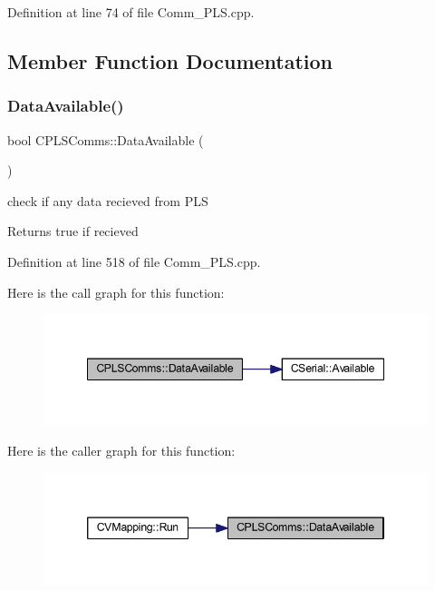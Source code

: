 Definition at line 74 of file Comm\+\_\+\+P\+L\+S.\+cpp.



\subsection{Member Function Documentation}
\mbox{\label{class_c_p_l_s_comms_ae9d000eff184034954829d76162654a5}} 
\subsubsection{\texorpdfstring{DataAvailable()}{DataAvailable()}}
{\footnotesize\ttfamily bool C\+P\+L\+S\+Comms\+::\+Data\+Available (\begin{DoxyParamCaption}{ }\end{DoxyParamCaption})}



check if any data recieved from P\+LS 

\begin{DoxyReturn}{Returns}
true if recieved 
\end{DoxyReturn}


Definition at line 518 of file Comm\+\_\+\+P\+L\+S.\+cpp.

Here is the call graph for this function\+:\nopagebreak
\begin{figure}[H]
\begin{center}
\leavevmode
\includegraphics[width=348pt]{class_c_p_l_s_comms_ae9d000eff184034954829d76162654a5_cgraph}
\end{center}
\end{figure}
Here is the caller graph for this function\+:\nopagebreak
\begin{figure}[H]
\begin{center}
\leavevmode
\includegraphics[width=346pt]{class_c_p_l_s_comms_ae9d000eff184034954829d76162654a5_icgraph}
\end{center}
\end{figure}
\mbox{\label{class_c_p_l_s_comms_a3124eaa4549706962c7024c7c97e82b0}} 
